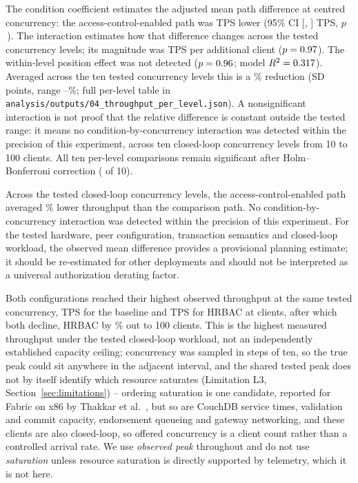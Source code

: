 The condition coefficient estimates the adjusted mean path difference at centred concurrency: the access-control-enabled path was \ThroughputConditionDiff{} TPS lower (95\% CI [\ThroughputConditionCILow, \ThroughputConditionCIHigh] TPS, $p$\,\ThroughputConditionP). The interaction estimates how that difference changes across the tested concurrency levels; its magnitude was \ThroughputInteractionCoef{} TPS per additional client ($p=0.97$). The within-level position effect was not detected ($p=0.96$; model $R^2=0.317$). Averaged across the ten tested concurrency levels this is a \ThroughputPctDiffMean\% reduction (SD \ThroughputPctDiffSd{} points, range \ThroughputPctDiffMin--\ThroughputPctDiffMax\%; full per-level table in \texttt{analysis/outputs/04\_throughput\_per\_level.json}). A nonsignificant interaction is not proof that the relative difference is constant outside the tested range: it means no condition-by-concurrency interaction was detected within the precision of this experiment, across ten closed-loop concurrency levels from 10 to 100 clients. All ten per-level comparisons remain significant after Holm--Bonferroni correction (\ThroughputSigAfterHolm{} of 10).

Across the tested closed-loop concurrency levels, the access-control-enabled path averaged \ThroughputPctDiffMean\% lower throughput than the comparison path. No condition-by-concurrency interaction was detected within the precision of this experiment. For the tested hardware, peer configuration, transaction semantics and closed-loop workload, the observed mean difference provides a provisional planning estimate; it should be re-estimated for other deployments and should not be interpreted as a universal authorization derating factor.

Both configurations reached their highest observed throughput at the same tested concurrency, \ThroughputBaselinePeak{} TPS for the baseline and \ThroughputHrbacPeak{} TPS for HRBAC at \ThroughputPeakLevel{} clients, after which both decline, HRBAC by \ThroughputHrbacDeclinePct\% out to 100 clients. This is the highest measured throughput under the tested closed-loop workload, not an independently established capacity ceiling; concurrency was sampled in steps of ten, so the true peak could sit anywhere in the adjacent interval, and the shared tested peak does not by itself identify which resource saturates (Limitation L3, Section~\ref{sec:limitations}) -- ordering saturation is one candidate, reported for Fabric on x86 by Thakkar et al.\ \citep{thakkar2018performance}, but so are CouchDB service times, validation and commit capacity, endorsement queueing and gateway networking, and these clients are also closed-loop, so offered concurrency is a client count rather than a controlled arrival rate. We use \emph{observed peak} throughout and do not use \emph{saturation} unless resource saturation is directly supported by telemetry, which it is not here.

